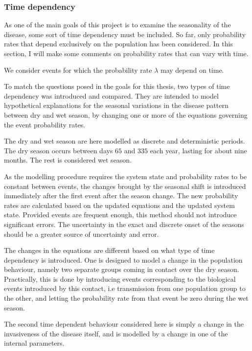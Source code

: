 \documentclass[10pt,a4paper]{article}
\begin{document}
\subsubsection{Time dependency}

As one of the main goals of this project is to examine the seasonality of the disease, some sort of time dependency must be included. So far, only probability rates that depend exclusively on the population has been considered. In this section, I will make some comments on probability rates that can vary with time.

We consider events for which the probability rate $\lambda$ may depend on time. 

To match the questions posed in the goals for this thesis, two types of time dependency was introduced and compared. They are intended to model hypothetical explanations for the seasonal variations in the disease pattern between dry and wet season, by changing one or more of the equations governing the event probability rates.

The dry and wet season are here modelled as discrete and deterministic periods. The dry season occurs between days $65$ and $335$ each year, lasting for about nine months. The rest is considered wet season.

As the modelling procedure requires the system state and probability rates to be constant between events, the changes brought by the seasonal shift is introduced immediately after the first event after the season change. The new probability rates are calculated based on the updated equations and the updated system state. Provided events are frequent enough, this method should not introduce significant errors. The uncertainty in the exact and discrete onset of the seasons should be a greater source of uncertainty and error.

The changes in the equations are different based on what type of time dependency is introduced. One is designed to model a change in the population behaviour, namely two separate groups coming in contact over the dry season. Practically, this is done by introducing events corresponding to the biological events introduced by this contact, i.e transmission from one population group to the other, and letting the probability rate from that event be zero during the wet season.

The second time dependent behaviour considered here is simply a change in the invasiveness of the disease itself, and is modelled by a change in one of the internal parameters.
\end{document}
